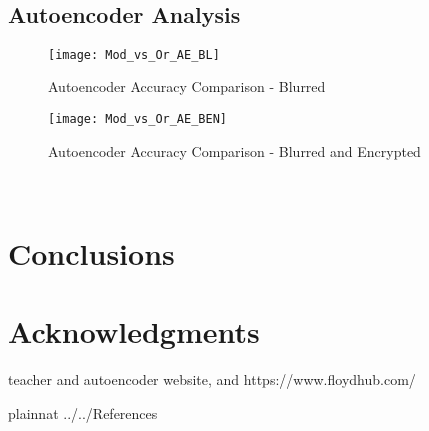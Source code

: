 \documentclass[12pt, titlepage]{article}
\begin{document}
~\newpage
\subsection{Autoencoder Analysis}

\begin{figure}[h!]
	\begin{center}
		\texttt{[image: Mod\_vs\_Or\_AE\_BL]}
		\caption{Autoencoder Accuracy Comparison - Blurred}
		\label{GRAPH_COMP_AE_BL}
	\end{center}
\end{figure}

\begin{figure}[h!]
	\begin{center}
		\texttt{[image: Mod\_vs\_Or\_AE\_BEN]}
		\caption{Autoencoder Accuracy Comparison - Blurred and Encrypted}
		\label{GRAPH_COMP_AE_BEN}
	\end{center}
\end{figure}

~\newpage 

\section{Conclusions}
\section{Acknowledgments}

teacher and autoencoder website, and https://www.floydhub.com/


\newpage

 {plainnat}
 {../../References}
\end{document}
